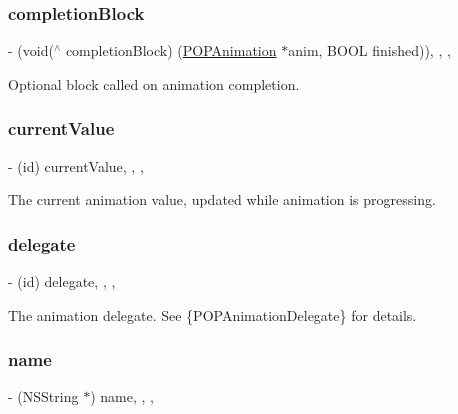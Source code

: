 \subsubsection{\texorpdfstring{completion\+Block}{completionBlock}}
{\footnotesize\ttfamily -\/ (void($^\wedge$ completion\+Block) (\mbox{\hyperlink{interface_p_o_p_animation}{P\+O\+P\+Animation}} $\ast$anim, B\+O\+OL finished))\hspace{0.3cm}{\ttfamily [read]}, {\ttfamily [write]}, {\ttfamily [nonatomic]}, {\ttfamily [copy]}}

Optional block called on animation completion. \mbox{\label{interface_p_o_p_animation_aa806865c6db615b3dc956ab83ad5108f}} 
\subsubsection{\texorpdfstring{current\+Value}{currentValue}}
{\footnotesize\ttfamily -\/ (id) current\+Value\hspace{0.3cm}{\ttfamily [read]}, {\ttfamily [nonatomic]}, {\ttfamily [copy]}, {\ttfamily [implementation]}}

The current animation value, updated while animation is progressing. \mbox{\label{interface_p_o_p_animation_ab4000b657f7d991a1c2639c6bd787b70}} 
\subsubsection{\texorpdfstring{delegate}{delegate}}
{\footnotesize\ttfamily -\/ (id) delegate\hspace{0.3cm}{\ttfamily [read]}, {\ttfamily [write]}, {\ttfamily [nonatomic]}, {\ttfamily [weak]}}

The animation delegate.  See \{P\+O\+P\+Animation\+Delegate\} for details. \mbox{\label{interface_p_o_p_animation_a021a12fa53c6acee3bd2726ae194e58a}} 
\subsubsection{\texorpdfstring{name}{name}}
{\footnotesize\ttfamily -\/ (N\+S\+String $\ast$) name\hspace{0.3cm}{\ttfamily [read]}, {\ttfamily [write]}, {\ttfamily [nonatomic]}, {\ttfamily [copy]}}


